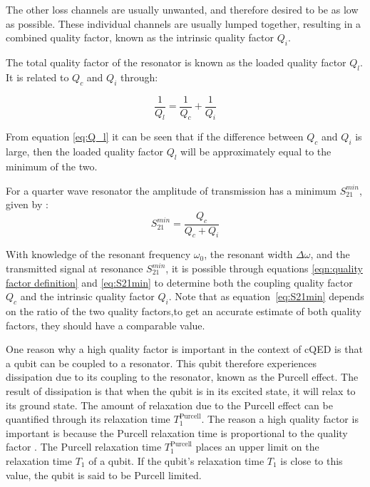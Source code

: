    The other loss channels are usually unwanted, and therefore desired to be as low as possible. These individual channels are usually lumped together, resulting in a combined quality factor, known as the intrinsic quality factor $Q_i$.

    The total quality factor of the resonator is known as the loaded quality factor $Q_l$. It is related to $Q_c$ and $Q_i$ through:

    \begin{equation}
        \frac{1}{Q_l} = \frac{1}{Q_c} + \frac{1}{Q_i}
        \label{eq:Q_l}
    \end{equation}

    From equation \ref{eq:Q_l} it can be seen that if the difference between $Q_c$ and $Q_i$ is large, then the loaded quality factor $Q_l$ will be approximately equal to the minimum of the two.


    For a quarter wave resonator the amplitude of transmission has a minimum $S_{21}^{min}$, given by \cite[p29]{Mazin}:
    \begin{equation}
        S_{21}^{min} = \frac{Q_c}{Q_c + Q_i}
        \label{eq:S21min}
    \end{equation}

    With knowledge of the resonant frequency $\omega_0$, the resonant width $\Delta \omega$, and the transmitted signal at resonance $S_{21}^{min}$, it is possible through equations \ref{eqn:quality factor definition} and \ref{eq:S21min} to determine both the coupling quality factor $Q_c$ and the intrinsic quality factor $Q_i$. Note that as equation~\ref{eq:S21min} depends on the ratio of the two quality factors,to get an accurate estimate of both quality factors, they should have a comparable value.

    One reason why a high quality factor is important in the context of cQED is that a qubit can be coupled to a resonator. This qubit therefore experiences dissipation due to its coupling to the resonator, known as the Purcell effect. The result of dissipation is that when the qubit is in its excited state, it will relax to its ground state. The amount of relaxation due to the Purcell effect can be quantified through its relaxation time $T_1^\text{Purcell}$. The reason a high quality factor is important is because the Purcell relaxation time is proportional to the quality factor \cite[p~22]{Geerlings}. The Purcell relaxation time $T_1^\text{Purcell}$ places an upper limit on the relaxation time $T_1$ of a qubit. If the qubit's relaxation time $T_1$ is close to this value, the qubit is said to be Purcell limited.



